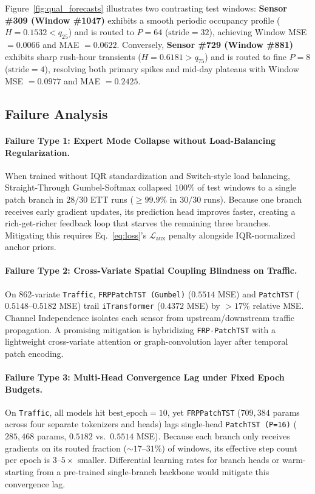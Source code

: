 \documentclass[11pt, letterpaper]{article}
\begin{document}
Figure~\ref{fig:qual_forecasts} illustrates two contrasting test windows: \textbf{Sensor \#309 (Window \#1047)} exhibits a smooth periodic occupancy profile ($H = 0.1532 < q_{25}$) and is routed to $P=64$ ($\mathrm{stride}=32$), achieving Window MSE $= 0.0066$ and MAE $= 0.0622$. Conversely, \textbf{Sensor \#729 (Window \#881)} exhibits sharp rush-hour transients ($H = 0.6181 > q_{75}$) and is routed to fine $P=8$ ($\mathrm{stride}=4$), resolving both primary spikes and mid-day plateaus with Window MSE $= 0.0977$ and MAE $= 0.2425$.

\subsection{Failure Analysis}

\paragraph{Failure Type 1: Expert Mode Collapse without Load-Balancing Regularization.} When trained without IQR standardization and Switch-style load balancing, Straight-Through Gumbel-Softmax collapsed $100\%$ of test windows to a single patch branch in $28/30$ ETT runs ($\ge 99.9\%$ in $30/30$ runs). Because one branch receives early gradient updates, its prediction head improves faster, creating a rich-get-richer feedback loop that starves the remaining three branches. Mitigating this requires Eq.~\eqref{eq:loss}'s $\mathcal{L}_{\mathrm{aux}}$ penalty alongside IQR-normalized anchor priors.

\paragraph{Failure Type 2: Cross-Variate Spatial Coupling Blindness on Traffic.} On 862-variate \texttt{Traffic}, \texttt{FRPPatchTST (Gumbel)} ($0.5514$ MSE) and \texttt{PatchTST} ($0.5148$--$0.5182$ MSE) trail \texttt{iTransformer} ($0.4372$ MSE) by $>17\%$ relative MSE. Channel Independence isolates each sensor from upstream/downstream traffic propagation. A promising mitigation is hybridizing \texttt{FRP-PatchTST} with a lightweight cross-variate attention or graph-convolution layer after temporal patch encoding.

\paragraph{Failure Type 3: Multi-Head Convergence Lag under Fixed Epoch Budgets.} On \texttt{Traffic}, all models hit $\mathrm{best\_epoch}=10$, yet \texttt{FRPPatchTST} ($709{,}384$ params across four separate tokenizers and heads) lags single-head \texttt{PatchTST (P=16)} ($285{,}468$ params, $0.5182$ vs.\ $0.5514$ MSE). Because each branch only receives gradients on its routed fraction ($\sim 17$--$31\%$) of windows, its effective step count per epoch is $3$--$5\times$ smaller. Differential learning rates for branch heads or warm-starting from a pre-trained single-branch backbone would mitigate this convergence lag.
\end{document}
